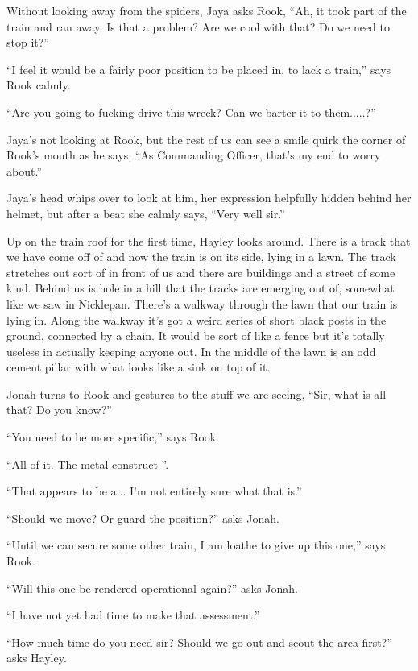 Without looking away from the spiders, Jaya asks Rook, ``Ah, it took part of the train and ran away. Is that a problem? Are we cool with that?  Do we need to stop it?''

``I feel it would be a fairly poor position to be placed in, to lack a train,'' says Rook calmly.

``Are you going to fucking drive this wreck?  Can we barter it to them.....?''

Jaya's not looking at Rook, but the rest of us can see a smile quirk the corner of Rook's mouth as he says, ``As Commanding Officer, that's my end to worry about.''

Jaya's head whips over to look at him, her expression helpfully hidden behind her helmet, but after a beat she calmly says, ``Very well sir.''



Up on the train roof for the first time, Hayley looks around.  There is a track that we have come off of and now the train is on its side, lying in a lawn.  The track stretches out sort of in front of us and there are buildings and a street of some kind.  Behind us is hole in a hill that the tracks are emerging out of, somewhat like we saw in Nicklepan.  There's a walkway through the lawn that our train is lying in.   Along the walkway it's got a weird series of short black posts in the ground, connected by a chain.  It would be sort of like a fence but it's totally useless in actually keeping anyone out.  In the middle of the lawn is an odd cement pillar with what looks like a sink on top of it.



Jonah turns to Rook and gestures to the stuff we are seeing, ``Sir, what is all that? Do you know?''

``You need to be more specific,'' says Rook

``All of it.  The metal construct-''.

``That appears to be a... I'm not entirely sure what that is.''

``Should we move?  Or guard the position?'' asks Jonah.

``Until we can secure some other train, I am loathe to give up this one,'' says Rook.

``Will this one be rendered operational again?'' asks Jonah.

``I have not yet had time to make that assessment.''

``How much time do you need sir?  Should we go out and scout the area first?'' asks Hayley.


